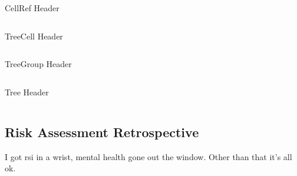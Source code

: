 \documentclass[twoside]{IIBproject}
\numberwithin{figure}{section}
\begin{document}
        \begin{listing}[ht]
            \caption{CellRef Header}
            \label{src:cellref}
            \inputminted[mathescape,fontsize=\footnotesize]{cpp}{headers/cellref.h}
        \end{listing}

        \begin{listing}[ht]
            \caption{TreeCell Header}
            \label{src:treecell}
            \inputminted[mathescape,fontsize=\footnotesize]{cpp}{headers/treecell.h}
        \end{listing}

        \begin{listing}[ht]
            \caption{TreeGroup Header}
            \label{src:treegroup}
            \inputminted[mathescape,fontsize=\footnotesize]{cpp}{headers/treegroup.h}
        \end{listing}

        \begin{listing}[ht]
            \caption{Tree Header}
            \label{src:tree}
            \inputminted[mathescape,fontsize=\footnotesize]{cpp}{headers/tree.h}
        \end{listing}





    \subsection{Risk Assessment Retrospective} %
        \label{sec:appendix-ra}

        I got rsi in a wrist, mental health gone out the window. Other than that it's all ok.


\end{document}
